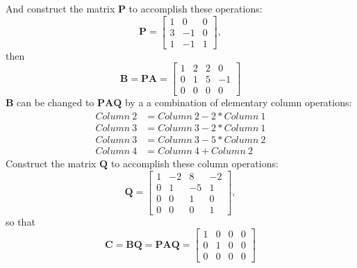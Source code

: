 \documentclass[22pt]{article}
\begin{document}
 	And construct the matrix  $\mathbf{P}$ to accomplish these operations:
 	\begin{equation}
 		 \mathbf{P} = \left[ \begin{array}{ccc} 1 & 0 & 0 \\3&-1&0\\1&-1&1
		\end{array}\right],
 	\end{equation}
 	then
 	\begin{equation}
 		\mathbf{B} = \mathbf{PA} = \left[ \begin{array}{cccc} 1 & 2 & 2&0 \\0&1&5&-1\\ 0 & 0&0&0
		\end{array}\right]
 	\end{equation}
   	$\mathbf{B}$ can be changed to $\mathbf{PAQ}$ by a a combination of elementary column operations:
   	\begin{align}
   		Column\ 2 &= Column\ 2 -2*Column\ 1 \\
   		Column\ 3 &= Column\ 3 -2*Column\ 1 \\
   		Column\ 3 &= Column\ 3 -5*Column\ 2 \\
   		Column\ 4 &= Column\ 4 +Column\ 2
   	\end{align}
   	Construct the matrix $\mathbf{Q}$ to accomplish these column operations:
   	\begin{equation}
   		\mathbf{Q} = \left[ \begin{array}{cccc} 1&-2&8&-2\\0&1&-5&1\\0&0&1&0\\0&0&0&1
		\end{array}\right],
   	\end{equation}
   	so that
   	\begin{equation}
   		\mathbf{C} = \mathbf{BQ} = \mathbf{PAQ} = \left[ \begin{array}{cccc} 1 & 0& 0&0 \\0&1&0&0\\ 0 & 0&0&0
   		\end{array}\right]
   	\end{equation}
\end{document}
